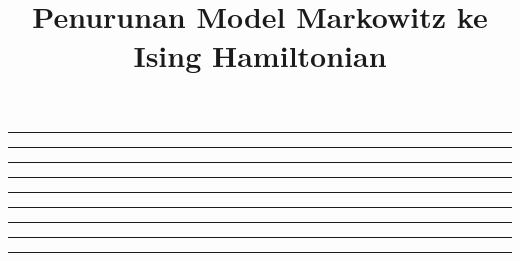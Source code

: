 \documentclass[12pt,a4paper]{article}
\title{Penurunan Model Markowitz ke Ising Hamiltonian}
\author{}
\date{}
\begin{document}
\maketitle
\tableofcontents
\newpage



\vspace{1em}
\begin{center}\rule{0.5\linewidth}{0.5pt}\end{center}



\vspace{1em}
\begin{center}\rule{0.5\linewidth}{0.5pt}\end{center}



\vspace{1em}
\begin{center}\rule{0.5\linewidth}{0.5pt}\end{center}



\vspace{1em}
\begin{center}\rule{0.5\linewidth}{0.5pt}\end{center}



\vspace{1em}
\begin{center}\rule{0.5\linewidth}{0.5pt}\end{center}



\vspace{1em}
\begin{center}\rule{0.5\linewidth}{0.5pt}\end{center}



\vspace{1em}
\begin{center}\rule{0.5\linewidth}{0.5pt}\end{center}



\vspace{1em}
\begin{center}\rule{0.5\linewidth}{0.5pt}\end{center}



\vspace{1em}
\begin{center}\rule{0.5\linewidth}{0.5pt}\end{center}


\end{document}
